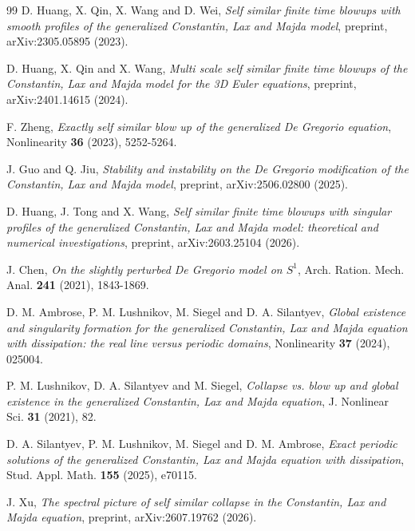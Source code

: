 \documentclass[11pt]{article}
\theoremstyle{definition}
\begin{document}
\begin{thebibliography}{99}
 D. Huang, X. Qin, X. Wang and D. Wei,
  \emph{Self similar finite time blowups with smooth profiles of the
  generalized Constantin, Lax and Majda model}, preprint,
  arXiv:2305.05895 (2023).

 D. Huang, X. Qin and X. Wang,
  \emph{Multi scale self similar finite time blowups of the Constantin, Lax and
  Majda model for the 3D Euler equations}, preprint, arXiv:2401.14615 (2024).

 F. Zheng,
  \emph{Exactly self similar blow up of the generalized De Gregorio equation},
  Nonlinearity \textbf{36} (2023), 5252-5264.

 J. Guo and Q. Jiu,
  \emph{Stability and instability on the De Gregorio modification of the
  Constantin, Lax and Majda model}, preprint, arXiv:2506.02800 (2025).

 D. Huang, J. Tong and X. Wang,
  \emph{Self similar finite time blowups with singular profiles of the
  generalized Constantin, Lax and Majda model: theoretical and numerical
  investigations}, preprint, arXiv:2603.25104 (2026).

 J. Chen,
  \emph{On the slightly perturbed De Gregorio model on $S^1$},
  Arch. Ration. Mech. Anal. \textbf{241} (2021), 1843-1869.

 D. M. Ambrose, P. M. Lushnikov, M. Siegel and
  D. A. Silantyev, \emph{Global existence and singularity formation for the
  generalized Constantin, Lax and Majda equation with dissipation: the real
  line versus periodic domains}, Nonlinearity \textbf{37} (2024), 025004.

 P. M. Lushnikov, D. A. Silantyev and M. Siegel,
  \emph{Collapse vs. blow up and global existence in the generalized
  Constantin, Lax and Majda equation}, J. Nonlinear Sci. \textbf{31} (2021),
  82.

 D. A. Silantyev, P. M. Lushnikov, M. Siegel and
  D. M. Ambrose, \emph{Exact periodic solutions of the generalized
  Constantin, Lax and Majda equation with dissipation},
  Stud. Appl. Math. \textbf{155} (2025), e70115.

 J. Xu, \emph{The spectral picture of self similar collapse in
  the Constantin, Lax and Majda equation}, preprint, arXiv:2607.19762 (2026).

\end{thebibliography}
\end{document}
